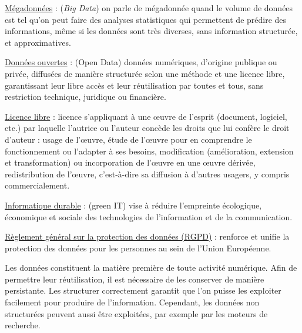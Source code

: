 \begin{jazzitemize}
\item \href{https://fr.wikipedia.org/wiki/Big_data}{Mégadonnées} : (\textit{Big Data}) on parle de mégadonnée \nopagebreak quand le volume de données est tel qu'on peut faire des analyses statistiques qui permettent de prédire des informations, même si les données sont très diverses, sans information structurée, et approximatives.
\item \href{https://fr.wikipedia.org/wiki/Donn\%C3\%A9es_ouvertes}{Données ouvertes} : (Open Data)  données numériques, d'origine publique ou privée, diffusées de manière structurée selon une méthode et une licence libre, garantissant leur libre accès et leur réutilisation par toutes et tous, sans restriction technique, juridique ou financière.
\item \href{https://fr.wikipedia.org/wiki/Licence_libre}{Licence libre} : licence s'appliquant à une œuvre de l'esprit (document, logiciel, etc.) par laquelle l'autrice ou l'auteur concède les droits que lui confère le droit d'auteur  : usage de l'œuvre, étude de l'œuvre pour en comprendre le fonctionnement ou l'adapter à ses besoins, modification (amélioration, extension et transformation) ou incorporation de l'œuvre en une œuvre dérivée, redistribution de l'œuvre, c'est-à-dire sa diffusion à d'autres usagers, y compris commercialement.
\item \href{https://fr.wikipedia.org/wiki/Informatique_durable}{Informatique durable} : (green IT) vise à réduire l'empreinte écologique, économique et sociale des technologies de l'information et de la communication.
\item \href{https://fr.wikipedia.org/wiki/R\%C3\%A8glement_g\%C3\%A9n\%C3\%A9ral_sur_la_protection_des_donn\%C3\%A9es}{Règlement général sur la protection des données (RGPD)} :  renforce et unifie la protection des données pour les personnes au sein de l'Union Européenne.
\end{jazzitemize}


\begin{tcolorbox}[title={Introduction}, toprule=0pt, leftrule=0pt, rightrule=0pt, arc=0pt, fonttitle=\scshape\boxtitlefont,
                  colbacktitle=white, coltitle=firstcolor, colframe=firstcolor, colback=firstcolor!10,
                  breakable, enhanced jigsaw]
Les données constituent la matière première de toute activité numérique. Afin de permettre leur réutilisation, il est nécessaire de les conserver de manière persistante. Les structurer correctement garantit que l’on puisse les exploiter facilement pour produire de l’information. Cependant, les données non structurées peuvent aussi être exploitées, par exemple par les moteurs de recherche.
\end{tcolorbox}


